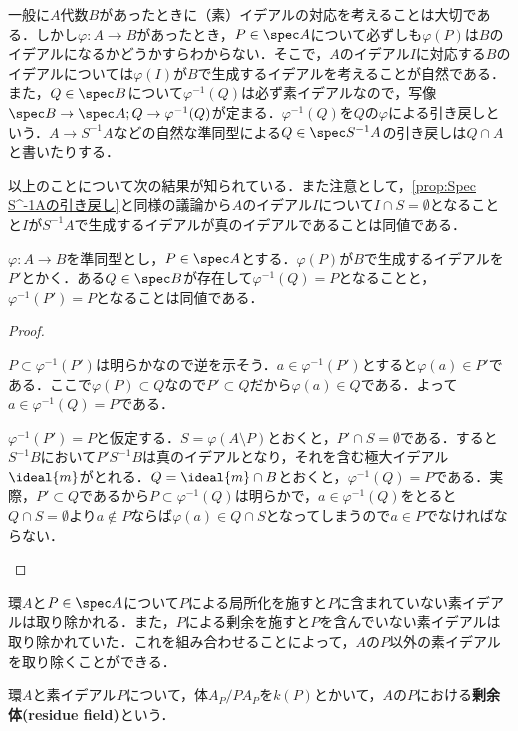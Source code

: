 一般に$A$代数$B$があったときに（素）イデアルの対応を考えることは大切である．しかし$\varphi:A\to B$があったとき，$P\in\spec A$について必ずしも$\varphi(P)$は$B$のイデアルになるかどうかすらわからない．そこで，$A$のイデアル$I$に対応する$B$のイデアルについては$\varphi(I)$が$B$で生成するイデアルを考えることが自然である．また，$Q\in\spec B$について$\varphi^{-1}(Q)$は必ず素イデアルなので，写像$\spec B\to\spec A;Q\to \varphi^{-1}(Q)$が定まる．$\varphi^{-1}(Q)$を$Q$の$\varphi$による引き戻しという．$A\to S^{-1}A$などの自然な準同型による$Q\in\spec S^{-1}A$の引き戻しは$Q\cap A$と書いたりする．

以上のことについて次の結果が知られている．また注意として，\ref{prop:Spec S^-1Aの引き戻し}と同様の議論から$A$のイデアル$I$について$I\cap S=\emptyset$となることと$I$が$S^{-1}A$で生成するイデアルが真のイデアルであることは同値である．

\begin{prop}\label{prop:上にイデアルがあることの同値条件}
	$\varphi:A\to B$を準同型とし，$P\in\spec A$とする．$\varphi(P)$が$B$で生成するイデアルを$P'$とかく．ある$Q\in\spec B$が存在して$\varphi^{-1}(Q)=P$となることと，$\varphi^{-1}(P')=P$となることは同値である．
\end{prop}

\begin{proof}
	\begin{eqv}
		\item $P\subset\varphi^{-1}(P')$は明らかなので逆を示そう．$a\in\varphi^{-1}(P')$とすると$\varphi(a)\in P'$である．ここで$\varphi(P)\subset Q$なので$P'\subset Q$だから$\varphi(a)\in Q$である．よって$a\in\varphi^{-1}(Q)=P$である．
		
		\item 	$\varphi^{-1}(P')=P$と仮定する．$S=\varphi(A\setminus P)$とおくと，$P'\cap S=\emptyset$である．すると$S^{-1}B$において$P'S^{-1}B$は真のイデアルとなり，それを含む極大イデアル${\ideal{m}}$がとれる．$Q={\ideal{m}}\cap B$とおくと，$\varphi^{-1}(Q)=P$である．実際，$P'\subset Q$であるから$P\subset\varphi^{-1}(Q)$は明らかで，$a\in\varphi^{-1}(Q)$をとると$Q\cap S=\emptyset$より$a\not\in P$ならば$\varphi(a)\in Q\cap S$となってしまうので$a\in P$でなければならない．
	\end{eqv}
\end{proof}

環$A$と$P\in\spec A$について$P$による局所化を施すと$P$に含まれていない素イデアルは取り除かれる．また，$P$による剰余を施すと$P$を含んでいない素イデアルは取り除かれていた．これを組み合わせることによって，$A$の$P$以外の素イデアルを取り除くことができる．
\begin{defi}[剰余体]
	環$A$と素イデアル$P$について，体$A_P/PA_P$を$k(P)$とかいて，$A$の$P$における\textbf{剰余体(residue field)}という．
\end{defi}

